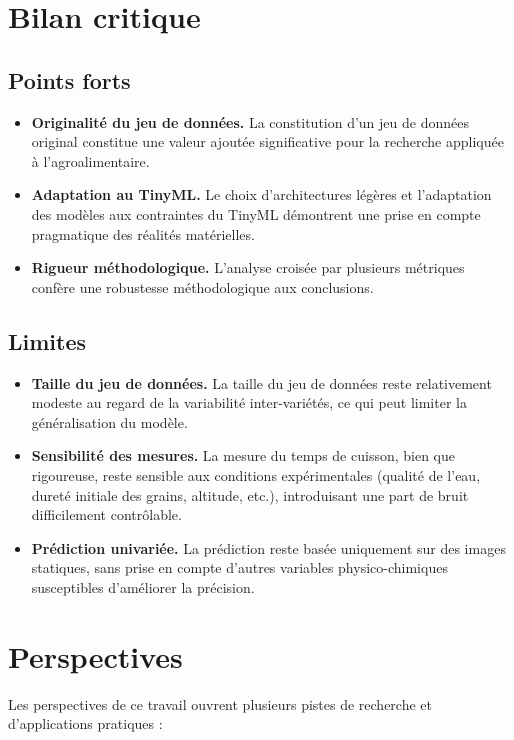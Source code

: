 \section{Bilan critique}
\label{sec:bilan_critique}

\subsection{Points forts}
\begin{itemize}
	\item \textbf{Originalité du jeu de données.} La constitution d'un jeu de données original constitue une valeur ajoutée significative pour la recherche appliquée à l'agroalimentaire.
	\item \textbf{Adaptation au TinyML.} Le choix d'architectures légères et l'adaptation des modèles aux contraintes du TinyML démontrent une prise en compte pragmatique des réalités matérielles.
	\item \textbf{Rigueur méthodologique.} L'analyse croisée par plusieurs métriques confère une robustesse méthodologique aux conclusions.
\end{itemize}

\subsection{Limites}
\begin{itemize}
	\item \textbf{Taille du jeu de données.} La taille du jeu de données reste relativement modeste au regard de la variabilité inter-variétés, ce qui peut limiter la généralisation du modèle.
	\item \textbf{Sensibilité des mesures.} La mesure du temps de cuisson, bien que rigoureuse, reste sensible aux conditions expérimentales (qualité de l'eau, dureté initiale des grains, altitude, etc.), introduisant une part de bruit difficilement contrôlable.
	\item \textbf{Prédiction univariée.} La prédiction reste basée uniquement sur des images statiques, sans prise en compte d'autres variables physico-chimiques susceptibles d'améliorer la précision.
\end{itemize}

\section{Perspectives}
\label{sec:perspectives}

Les perspectives de ce travail ouvrent plusieurs pistes de recherche et d'applications pratiques :

